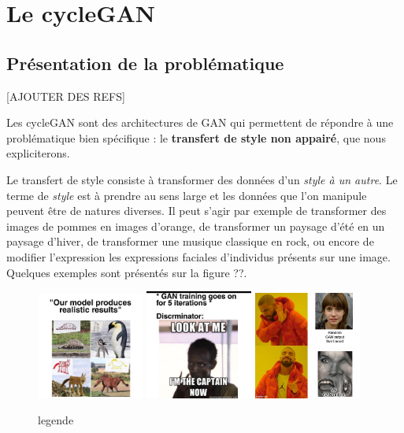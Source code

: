 \chapter{Le cycleGAN}

\section{Présentation de la problématique}

[AJOUTER DES REFS]

Les cycleGAN sont des architectures de GAN qui permettent de répondre à une problématique bien spécifique : le \textbf{transfert de style non appairé}, que nous expliciterons.

Le transfert de style consiste à transformer des données d'un \textit{style à un autre}. Le terme de \textit{style} est à prendre au sens large et les données que l'on manipule peuvent être de natures diverses. Il peut s'agir par exemple de transformer des images de pommes en images d'orange, de transformer un paysage d'été en un paysage d'hiver, de transformer une musique classique en rock, ou encore de modifier l'expression les expressions faciales d'individus présents sur une image. Quelques exemples sont présentés sur la figure ??.

\begin{figure}[!h]
\centering
\includegraphics[width=100pt]{"images/image_test"}
\includegraphics[width=100pt]{"images/image_test2"}
\includegraphics[width=100pt]{"images/image_test3"}
\caption{legende}
\end{figure}

